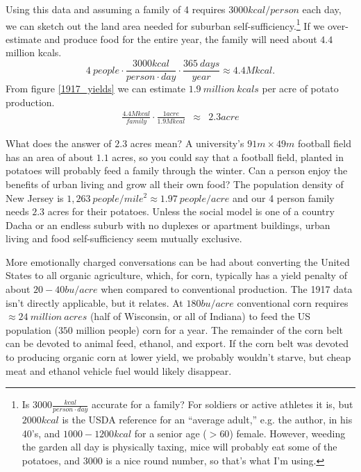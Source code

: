 \documentclass[onecolumn]{article}
\newcommand{\be}{\begin{equation}}
\newcommand{\ee}{\end{equation}}
\newcommand{\bea}{\begin{eqnarray}}
\newcommand{\eea}{\end{eqnarray}}
\begin{document}
Using this data and assuming a family of 4 requires $3000kcal/person$ each day, we can sketch out the land area needed for suburban self-sufficiency.\footnote{
Is $3000\frac{kcal}{person\cdot day}$ accurate for a family?  For soldiers or active athletes it is, but $2000kcal$ is the USDA reference for an ``average adult,'' e.g. the author, in his 40's, and   $1000-1200kcal$ for a senior age ($>60$) female.  However, weeding the garden all day is physically taxing, mice will probably eat some of the potatoes, and $3000$ is a nice round number, so that's what I'm using.
}
If we over-estimate and produce food for the entire year, the family will need about $4.4$ million kcals.
\be
4~people\cdot\frac{3000kcal}{person\cdot day}\cdot\frac{365~days}{year} \approx 4.4 M kcal . 
\ee
From figure \ref{1917_yields} we can estimate $1.9~million~kcals$ per acre of potato production.  
\bea
\frac{4.4 M kcal}{family}\cdot\frac{1 acre}{1.9M kcal}  & \approx& 2.3 acre
\eea

What does the answer of $2.3$ acres mean?  A university's $91m\times49m$ football field has an area of about $1.1$ acres, so you could say that a football field, planted in potatoes will probably feed a family through the winter. \cite{Deppe}
Can a person enjoy the benefits of urban living and grow all their own food?  The population density of New Jersey is $1,263~people/mile^2 \approx1.97~people/acre$ and our 4 person family needs $2.3$ acres for their potatoes.  
Unless the social model is one of a country Dacha or an endless suburb with no duplexes or apartment buildings, urban living and food self-sufficiency seem mutually exclusive.


More emotionally charged conversations can be had about converting the United States to all organic agriculture, which, for corn, typically has a yield penalty of about $20-40bu/acre$ when compared to conventional production.  The 1917 data isn't directly applicable, but it relates. At $180bu/acre$ conventional corn requires $\approx 24~million~acres$ (half of Wisconsin, or all of Indiana) to feed the US population ($350$ million people) corn for a year.  The remainder of the corn belt can be devoted to animal feed, ethanol, and export.  If the corn belt was devoted to producing organic corn at lower yield, \cite{organic_corn_yield} we probably wouldn't starve, but cheap meat and ethanol vehicle fuel would likely disappear.   
\end{document}
